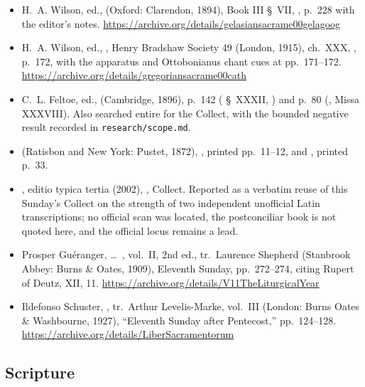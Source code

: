 \begin{itemize}[leftmargin=1.2em, itemsep=0.15em]
\item H.~A. Wilson, ed.,  (Oxford: Clarendon, 1894), Book III §~VII, , p.~228 with the editor's notes.
\url{https://archive.org/details/gelasiansacrame00gelagoog}
\item H.~A. Wilson, ed., , Henry Bradshaw Society 49 (London, 1915), ch.\ XXX, , p.~172, with the apparatus and Ottobonianus chant cues
at pp.~171--172. \url{https://archive.org/details/gregoriansacrame00cath}
\item C.~L. Feltoe, ed.,  (Cambridge, 1896),
p.~142 ( §~XXXII, ) and p.~80
(, Missa XXXVIII). Also searched entire for the Collect,
with the bounded negative result recorded in \texttt{research/scope.md}.
\item {}
(Ratisbon and New York: Pustet, 1872), ,
printed pp.~11--12, and , printed p.~33.
\item {}, editio typica tertia (2002), , Collect. Reported as a verbatim reuse of this Sunday's
Collect on the strength of two independent unofficial Latin transcriptions; no
official scan was located, the postconciliar book is not quoted here, and the
official locus remains a lead.
\item Prosper Guéranger,  \dots\ , vol.~II, 2nd ed., tr.\ Laurence Shepherd (Stanbrook Abbey: Burns
\& Oates, 1909), Eleventh Sunday, pp.~272--274, citing Rupert of Deutz,
 XII, 11.
\url{https://archive.org/details/V11TheLiturgicalYear}
\item Ildefonso Schuster, , tr.\
Arthur Levelis-Marke, vol.~III (London: Burns Oates \& Washbourne, 1927),
``Eleventh Sunday after Pentecost,'' pp.~124--128.
\url{https://archive.org/details/LiberSacramentorum}
\end{itemize}

\subsection*{Scripture}

